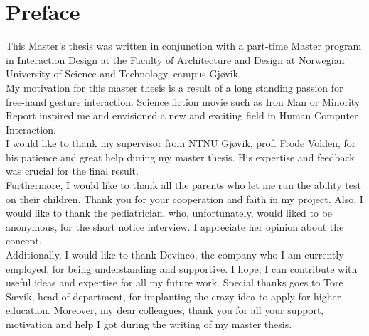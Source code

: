 \hypersetup{pageanchor=false}
%

\chapter*{Preface}



This Master's thesis was written in conjunction with a part-time Master program in Interaction Design at the Faculty of Architecture and Design at Norwegian University of Science and Technology, campus Gjøvik.\\%

My motivation for this master thesis is a result of a long standing passion for free-hand gesture interaction. Science fiction movie such as Iron Man or Minority Report inspired me and envisioned a new and exciting field in Human Computer Interaction.\\


I would like to thank my supervisor from NTNU Gjøvik, prof. Frode Volden, for his patience and great help during my master thesis. His expertise and feedback was crucial for the final result.\\

Furthermore, I would like to thank all the parents who let me run the ability test on their children. Thank you for your cooperation and faith in my project. 
Also, I would like to thank the pediatrician, who, unfortunately, would liked to be anonymous,  for the short notice interview. I appreciate her opinion about the concept.\\

Additionally, I would like to thank Devinco, the company who I am currently employed, for being understanding and supportive. I hope, I can contribute with useful ideas and expertise for all my future work. Special thanks goes to Tore Sævik, head of department, for implanting the crazy idea to apply for higher education. Moreover, my dear colleagues, thank you for all your support, motivation and help I got during the writing of my master thesis. \\

